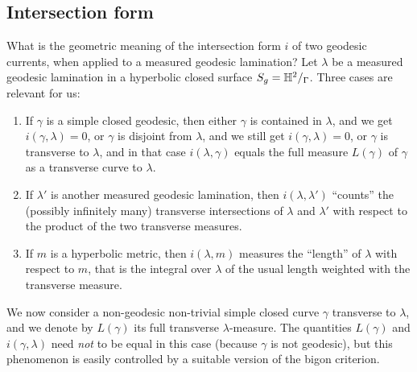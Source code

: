 
\subsection{Intersection form}
What is the geometric meaning of the intersection form $i$ of two geodesic currents, when applied to a measured geodesic lamination? Let $\lambda$ be a measured geodesic lamination in a hyperbolic closed surface $S_g=\mathbb{H}^2/_\Gamma$. Three cases are relevant for us:

\begin{enumerate}
\item If $\gamma$ is a simple closed geodesic, then either $\gamma$ is contained in $\lambda$, and we get $i(\gamma, \lambda)=0$, or $\gamma$ is disjoint from $\lambda$, and we still get $i(\gamma,\lambda)=0$, or $\gamma$ is transverse to $\lambda$, and in that case $i(\lambda, \gamma)$ equals the full measure $L(\gamma)$ of $\gamma$ as a transverse curve to $\lambda$.
\item If $\lambda'$ is another measured geodesic lamination, then $i(\lambda, \lambda')$ ``counts'' the (possibly infinitely many) transverse intersections of $\lambda$ and $\lambda'$ with respect to the product of the two transverse measures.
\item If $m$ is a hyperbolic metric, then $i(\lambda, m)$ measures the ``length'' of $\lambda$ with respect to $m$, that is the integral over $\lambda$ of the usual length weighted with the transverse measure.
\end{enumerate}

We now consider a non-geodesic non-trivial simple closed curve $\gamma$ transverse to $\lambda$, and we denote by $L(\gamma)$ its full transverse $\lambda$-measure. The quantities $L(\gamma)$ and $i(\gamma, \lambda)$ need \emph{not} to be equal in this case (because $\gamma$ is not geodesic), but this phenomenon is easily controlled by a suitable version of the bigon criterion.

